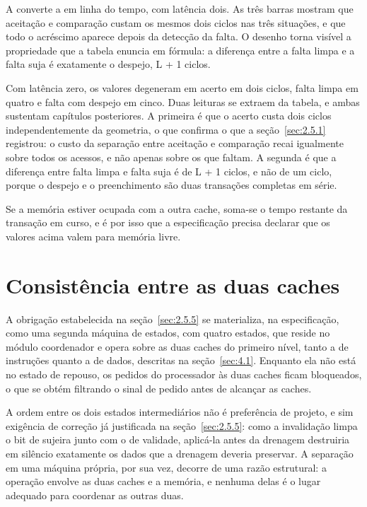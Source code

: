 A  converte a  em linha do tempo, com latência dois. As três barras mostram que aceitação e comparação custam os mesmos dois ciclos nas três situações, e que todo o acréscimo aparece depois da detecção da falta. O desenho torna visível a propriedade que a tabela enuncia em fórmula: a diferença entre a falta limpa e a falta suja é exatamente o despejo, L + 1 ciclos.


Com latência zero, os valores degeneram em acerto em dois ciclos, falta limpa em quatro e falta com despejo em cinco. Duas leituras se extraem da tabela, e ambas sustentam capítulos posteriores. A primeira é que o acerto custa dois ciclos independentemente da geometria, o que confirma o que a seção~\ref{sec:2.5.1} registrou: o custo da separação entre aceitação e comparação recai igualmente sobre todos os acessos, e não apenas sobre os que faltam. A segunda é que a diferença entre falta limpa e falta suja é de L + 1 ciclos, e não de um ciclo, porque o despejo e o preenchimento são duas transações completas em série.

Se a memória estiver ocupada com a outra cache, soma-se o tempo restante da transação em curso, e é por isso que a especificação precisa declarar que os valores acima valem para memória livre.

\section{Consistência entre as duas caches}\label{sec:4.8}

A obrigação estabelecida na seção~\ref{sec:2.5.5} se materializa, na especificação, como uma segunda máquina de estados, com quatro estados, que reside no módulo coordenador e opera sobre as duas caches do primeiro nível, tanto a de instruções quanto a de dados, descritas na seção~\ref{sec:4.1}. Enquanto ela não está no estado de repouso, os pedidos do processador às duas caches ficam bloqueados, o que se obtém filtrando o sinal de pedido antes de alcançar as caches.

A ordem entre os dois estados intermediários não é preferência de projeto, e sim exigência de correção já justificada na seção~\ref{sec:2.5.5}: como a invalidação limpa o bit de sujeira junto com o de validade, aplicá-la antes da drenagem destruiria em silêncio exatamente os dados que a drenagem deveria preservar. A separação em uma máquina própria, por sua vez, decorre de uma razão estrutural: a operação envolve as duas caches e a memória, e nenhuma delas é o lugar adequado para coordenar as outras duas.

